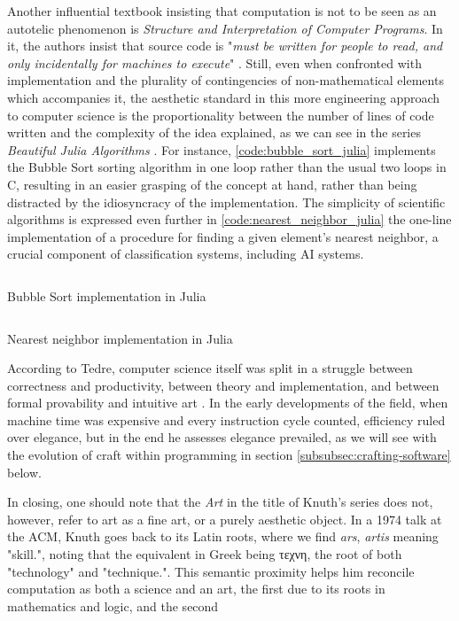 Another influential textbook insisting that computation is not to be seen as an autotelic phenomenon is \emph{Structure and Interpretation of Computer Programs}. In it, the authors insist that source code is "\emph{must be written for people to read, and only incidentally for machines to execute}" \citep{abelson_structure_1979}. Still, even when confronted with implementation and the plurality of contingencies of non-mathematical elements which accompanies it, the aesthetic standard in this more engineering approach to computer science is the proportionality between the number of lines of code written and the complexity of the idea explained, as we can see in the series \emph{Beautiful Julia Algorithms} \citep{moss_beautifulalgorithms_2022}. For instance, \ref{code:bubble_sort_julia} implements the Bubble Sort sorting algorithm in one loop rather than the usual two loops in C, resulting in an easier grasping of the concept at hand, rather than being distracted by the idiosyncracy of the implementation. The simplicity of scientific algorithms is expressed even further in \ref{code:nearest_neighbor_julia} the one-line implementation of a procedure for finding a given element's nearest neighbor, a crucial component of classification systems, including AI systems.

\begin{listing}
  \inputminted{julia}{./corpus/bubblesort.jl}
  \caption{Bubble Sort implementation in Julia}
  \label{code:bubble_sort_julia}
\end{listing}

\begin{listing}
  \inputminted{julia}{./corpus/nearest_neighbor.jl}
  \caption{Nearest neighbor implementation in Julia}
  \label{code:nearest_neighbor_julia}
\end{listing}

According to Tedre, computer science itself was split in a struggle between correctness and productivity, between theory and implementation, and between formal provability and intuitive art \citep{tedre_science_2014}. In the early developments of the field, when machine time was expensive and every instruction cycle counted, efficiency ruled over elegance, but in the end he assesses elegance prevailed, as we will see with the evolution of craft within programming in section \ref{subsubsec:crafting-software} below.

In closing, one should note that the \emph{Art} in the title of Knuth's series does not, however, refer to art as a fine art, or a purely aesthetic object. In a 1974 talk at the ACM, Knuth goes back to its Latin roots, where we find \emph{ars}, \emph{artis} meaning "skill.", noting that the equivalent in Greek being τεχνη, the root of both "technology" and "technique.". This semantic proximity helps him reconcile computation as both a science and an art, the first due to its roots in mathematics and logic, and the second

